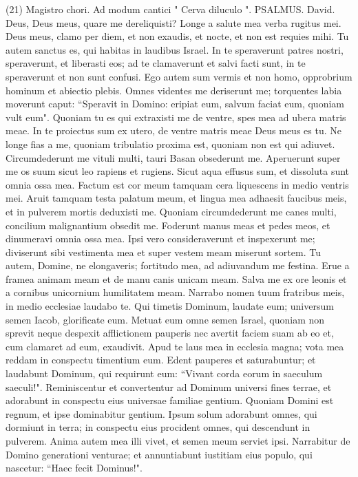 \begin{biblechapter}  (21) 
\verse  Magistro chori. Ad modum cantici " Cerva diluculo ". PSALMUS. David. 
\verse Deus, Deus meus, quare me dereliquisti? Longe a salute mea verba rugitus mei. 
\verse Deus meus, clamo per diem, et non exaudis, et nocte, et non est requies mihi. 
\verse Tu autem sanctus es, qui habitas in laudibus Israel. 
\verse In te speraverunt patres nostri, speraverunt, et liberasti eos; 
\verse ad te clamaverunt et salvi facti sunt, in te speraverunt et non sunt confusi. 
\verse Ego autem sum vermis et non homo, opprobrium hominum et abiectio plebis. 
\verse Omnes videntes me deriserunt me; torquentes labia moverunt caput: 
\verse “Speravit in Domino: eripiat eum, salvum faciat eum, quoniam vult eum". 
\verse Quoniam tu es qui extraxisti me de ventre, spes mea ad ubera matris meae. 
\verse In te proiectus sum ex utero, de ventre matris meae Deus meus es tu. 
\verse Ne longe fias a me, quoniam tribulatio proxima est, quoniam non est qui adiuvet. 
\verse Circumdederunt me vituli multi, tauri Basan obsederunt me. 
\verse Aperuerunt super me os suum sicut leo rapiens et rugiens. 
\verse Sicut aqua effusus sum, et dissoluta sunt omnia ossa mea. Factum est cor meum tamquam cera liquescens in medio ventris mei. 
\verse Aruit tamquam testa palatum meum, et lingua mea adhaesit faucibus meis, et in pulverem mortis deduxisti me. 
\verse Quoniam circumdederunt me canes multi, concilium malignantium obsedit me. Foderunt manus meas et pedes meos, 
\verse et dinumeravi omnia ossa mea. Ipsi vero consideraverunt et inspexerunt me; 
\verse diviserunt sibi vestimenta mea et super vestem meam miserunt sortem. 
\verse Tu autem, Domine, ne elongaveris; fortitudo mea, ad adiuvandum me festina. 
\verse Erue a framea animam meam et de manu canis unicam meam. 
\verse Salva me ex ore leonis et a cornibus unicornium humilitatem meam. 
\verse Narrabo nomen tuum fratribus meis, in medio ecclesiae laudabo te. 
\verse Qui timetis Dominum, laudate eum; universum semen Iacob, glorificate eum. Metuat eum omne semen Israel, 
\verse quoniam non sprevit neque despexit afflictionem pauperis nec avertit faciem suam ab eo et, cum clamaret ad eum, exaudivit. 
\verse Apud te laus mea in ecclesia magna; vota mea reddam in conspectu timentium eum. 
\verse Edent pauperes et saturabuntur; et laudabunt Dominum, qui requirunt eum: “Vivant corda eorum in saeculum saeculi!". 
\verse Reminiscentur et convertentur ad Dominum universi fines terrae, et adorabunt in conspectu eius universae familiae gentium. 
\verse Quoniam Domini est regnum, et ipse dominabitur gentium. 
\verse Ipsum solum adorabunt omnes, qui dormiunt in terra; in conspectu eius procident omnes, qui descendunt in pulverem. Anima autem mea illi vivet, 
\verse et semen meum serviet ipsi. Narrabitur de Domino generationi venturae; 
\verse et annuntiabunt iustitiam eius populo, qui nascetur: “Haec fecit Dominus!". 
\end{biblechapter}


